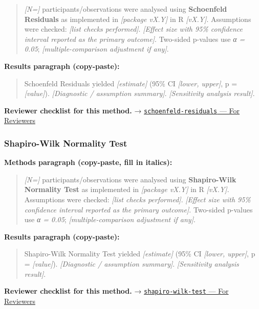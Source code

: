 \documentclass[
]{article}
\begin{document}
\begin{quote}
\emph{{[}N={]}} participants/observations were analysed using
\textbf{Schoenfeld Residuals} as implemented in \emph{{[}package
vX.Y{]}} in R \emph{{[}vX.Y{]}}. Assumptions were checked: \emph{{[}list
checks performed{]}}. \emph{{[}Effect size with 95\% confidence interval
reported as the primary outcome{]}}. Two-sided p-values use \emph{α =
0.05}; \emph{{[}multiple-comparison adjustment if any{]}}.
\end{quote}

\textbf{Results paragraph (copy-paste):}

\begin{quote}
Schoenfeld Residuals yielded \emph{{[}estimate{]}} (95\% CI
\emph{{[}lower, upper{]}}, p = \emph{{[}value{]}}). \emph{{[}Diagnostic
/ assumption summary{]}}. \emph{{[}Sensitivity analysis result{]}}.
\end{quote}

\textbf{Reviewer checklist for this method.} →
\href{../chapters/11-survival/schoenfeld-residuals.Rmd\#for-reviewers}{\texttt{schoenfeld-residuals}
--- For Reviewers}

\subsubsection{Shapiro-Wilk Normality
Test}\label{shapiro-wilk-normality-test}

\textbf{Methods paragraph (copy-paste, fill in italics):}

\begin{quote}
\emph{{[}N={]}} participants/observations were analysed using
\textbf{Shapiro-Wilk Normality Test} as implemented in \emph{{[}package
vX.Y{]}} in R \emph{{[}vX.Y{]}}. Assumptions were checked: \emph{{[}list
checks performed{]}}. \emph{{[}Effect size with 95\% confidence interval
reported as the primary outcome{]}}. Two-sided p-values use \emph{α =
0.05}; \emph{{[}multiple-comparison adjustment if any{]}}.
\end{quote}

\textbf{Results paragraph (copy-paste):}

\begin{quote}
Shapiro-Wilk Normality Test yielded \emph{{[}estimate{]}} (95\% CI
\emph{{[}lower, upper{]}}, p = \emph{{[}value{]}}). \emph{{[}Diagnostic
/ assumption summary{]}}. \emph{{[}Sensitivity analysis result{]}}.
\end{quote}

\textbf{Reviewer checklist for this method.} →
\href{../chapters/04-inferential/shapiro-wilk-test.Rmd\#for-reviewers}{\texttt{shapiro-wilk-test}
--- For Reviewers}
\end{document}
